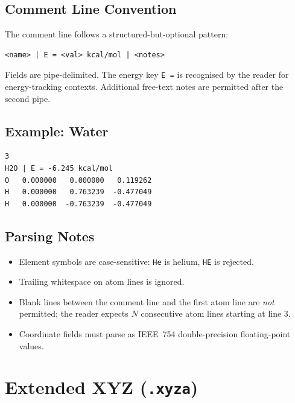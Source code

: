 \documentclass[12pt, a4paper, oneside]{article}
\begin{document}
\subsection{Comment Line Convention}

The comment line follows a structured-but-optional pattern:

\begin{lstlisting}[language={},frame=single]
<name> | E = <val> kcal/mol | <notes>
\end{lstlisting}

Fields are pipe-delimited.  The energy key \texttt{E =} is recognised
by the reader for energy-tracking contexts.  Additional free-text
notes are permitted after the second pipe.

\subsection{Example: Water}

\begin{lstlisting}[language={},frame=single]
3
H2O | E = -6.245 kcal/mol
O   0.000000   0.000000   0.119262
H   0.000000   0.763239  -0.477049
H   0.000000  -0.763239  -0.477049
\end{lstlisting}

\subsection{Parsing Notes}

\begin{itemize}
  \item Element symbols are case-sensitive: \texttt{He} is helium,
        \texttt{HE} is rejected.
  \item Trailing whitespace on atom lines is ignored.
  \item Blank lines between the comment line and the first atom line
        are \emph{not} permitted; the reader expects $N$ consecutive
        atom lines starting at line 3.
  \item Coordinate fields must parse as IEEE~754 double-precision
        floating-point values.
\end{itemize}

\section{Extended XYZ (\texttt{.xyza})}
\label{sec:xyza}
\end{document}
